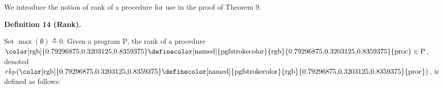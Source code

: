 \documentclass[10pt,a4paper]{amsart}
\begin{document}
 
We introduce the notion of rank of a procedure for use in the proof of Theorem 9.\par
 
 
 
\par\medskip\noindent\textbf{Definition 14 (Rank).}\par
 
 
Set $\max(\emptyset)\triangleq 0$. Given a program $\mathrm{P}$, the rank of a procedure $\text{\color[rgb]{0.79296875,0.3203125,0.8359375}\definecolor[named]{%
pgfstrokecolor}{rgb}{0.79296875,0.3203125,0.8359375}{{proc}}}\in\mathrm{P}{}$, denoted $rk_{\mathrm{P}}(\text{\color[rgb]{0.79296875,0.3203125,0.8359375}\definecolor[%
named]{pgfstrokecolor}{rgb}{0.79296875,0.3203125,0.8359375}{{proc}}})$, is defined as follows:\par
 
 
\end{document}
